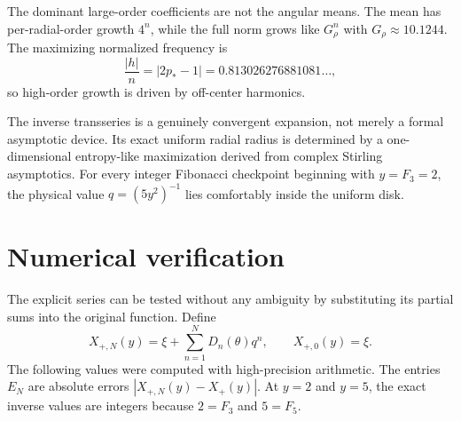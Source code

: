 \documentclass[11pt,oneside]{article}
\numberwithin{equation}{section}
\theoremstyle{plain}
\theoremstyle{definition}
\theoremstyle{remark}
\begin{document}
The dominant large-order coefficients are not the angular means.  The mean
has per-radial-order growth \(4^n\), while the full norm grows like
\(G_\rho^n\) with \(G_\rho\approx10.1244\).  The maximizing normalized
frequency is
\[
 \frac{|h|}{n}=|2p_*-1|
 =0.813026276881081\ldots,
\]
so high-order growth is driven by off-center harmonics.

\begin{summarybox}
The inverse transseries is a genuinely convergent expansion, not merely a
formal asymptotic device.  Its exact uniform radial radius is determined by
a one-dimensional entropy-like maximization derived from complex Stirling
asymptotics.  For every integer Fibonacci checkpoint beginning with
\(y=F_3=2\), the physical value \(q=(5y^2)^{-1}\) lies comfortably inside
the uniform disk.
\end{summarybox}
\section{Numerical verification}\label{sec:numerics}

The explicit series can be tested without any ambiguity by substituting its
partial sums into the original function.  Define
\begin{equation}\label{eq:XN-def}
 X_{+,N}(y)=\xi+\sum_{n=1}^ND_n(\theta)q^n,
 \qquad X_{+,0}(y)=\xi.
\end{equation}
The following values were computed with high-precision arithmetic.  The
entries \(E_N\) are absolute errors
\(
 |X_{+,N}(y)-X_+(y)|
\).  At \(y=2\) and \(y=5\), the exact inverse values are integers because
\(2=F_3\) and \(5=F_5\).
\end{document}
